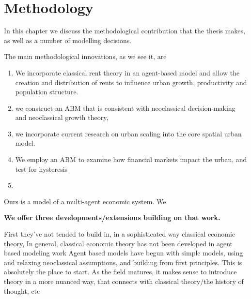 \chapter{Methodology} \label{chapter-methodology}

In this chapter we discuss the methodological contribution that the thesis makes, as well as a number of modelling decisions.

The main methodological innovations, as we see it, are


\begin{enumerate}
    \item We incorporate classical rent theory in an agent-based model and allow the creation and distribution of rents to influence urban growth, productivity and   population structure.  
    \item we construct an ABM that is consistent with neoclassical decision-making and neoclassical growth theory,
    \item we incorporate current research on urban scaling into the  core spatial urban model.  
    \item We employ an ABM to examine how financial markets impact the urban,  and test for hysteresis
    \item 
\end{enumerate}

Ours is a  model of a multi-agent economic system. We 


\textbf{We offer three developments/extensions building on that work.}


First they've not tended to build in, in a sophisticated way classical economic theory,
In general, classical economic theory has not been developed in agent based modeling work
Agent based models have begun with simple models, using and relaxing neoclassical assumptions, and building from first principles. This is absolutely the place to start. As the field matures, it makes sense to introduce theory in a more nuanced way, that connects with classical theory/the history of thought, etc


